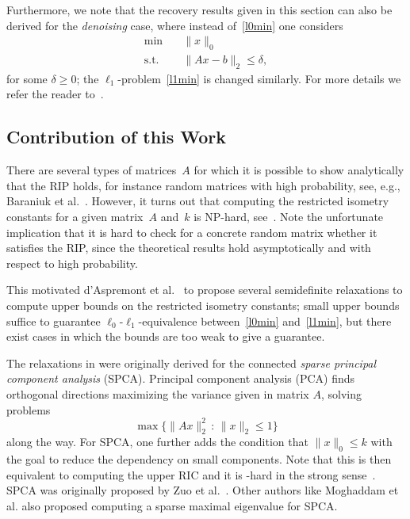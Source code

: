 \documentclass[journal]{IEEEtran}
\newcommand{\suchthat}{\,:\,}
\newcommand{\Norm}[2]{\lVert{#1}\rVert_{#2}}
\newcommand{\NP}{\text{NP}}
\begin{document}
Furthermore, we note that the recovery results given in this section can also be derived 
for the \emph{denoising} case, where instead of~\eqref{l0min} one considers
\begin{align}\label{l0minDenoising}
  \min \quad & \Norm{x}{0} \tag{$P_0^\delta$}\\
  \text{s.t.} \quad & \Norm{Ax - b}{2} \leq \delta, \nonumber
\end{align}
for some $\delta \geq 0$; the $\ell_1$-problem~\eqref{l1min} is changed
similarly. For more details we refer the reader to~\cite{FouR13}.


\subsection{Contribution of this Work}

\noindent
There are several types of matrices~$A$ for which it is possible
to show analytically that the RIP holds, for instance random
matrices with high probability, see, e.g., Baraniuk et al.~\cite{BDDW08}.
However, it turns out that computing the restricted isometry
constants for a given matrix~$A$ and~$k$ is NP-hard, see~\cite{PT14}. 
Note the unfortunate implication that it is hard to check for a
concrete random matrix whether it satisfies the RIP, since the theoretical
results hold asymptotically and with respect to high probability.

This motivated d'Aspremont et al.~\cite{Asp08,Asp07} to propose several
semidefinite relaxations to compute upper bounds on the restricted isometry
constants; small upper bounds suffice to guarantee
$\ell_0$-$\ell_1$-equivalence between~\eqref{l0min} and~\eqref{l1min}, but
there exist cases in which the bounds are too weak to give a guarantee.

The relaxations in \cite{Asp08,Asp07} were originally derived for the
connected \emph{sparse principal component analysis} (SPCA). Principal
component analysis (PCA) finds orthogonal directions maximizing the 
variance given in matrix $A$, solving problems
\[
\max \{ \Norm{A x}{2}^2 \suchthat \Norm{x}{2} \leq 1\}
\]
along the way. For SPCA, one further adds the condition that $\Norm{x}{0}
\leq k$ with the goal to reduce the dependency on small components. Note
that this is then equivalent to computing the upper RIC and it is \NP-hard
in the strong sense~\cite{PT14}. SPCA was
originally proposed by Zuo et al.~\cite{SPCA}. Other authors like Moghaddam et al.
\cite{sbSPCA} also proposed computing a sparse maximal eigenvalue for SPCA.
\end{document}
